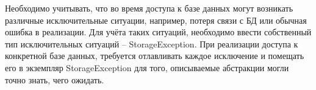 Необходимо учитывать, что во время доступа к базе данных могут возникать различные исключительные ситуации, например, потеря связи с БД или обычная ошибка в реализации.
Для учёта таких ситуаций, необходимо ввести собственный тип исключительных ситуаций -- StorageException.
При реализации доступа к конкретной базе данных, требуется отлавливать каждое исключение и помещать его в экземпляр StorageException для того, описываемые абстракции могли точно знать, чего ожидать.

